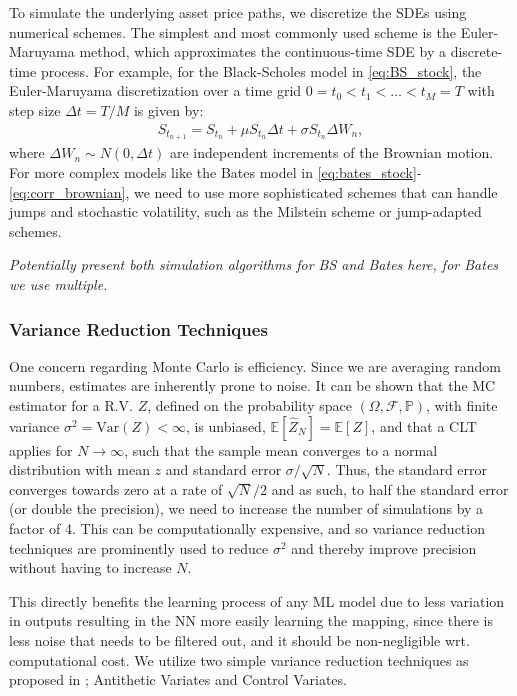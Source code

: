 To simulate the underlying asset price paths, we discretize the SDEs using numerical schemes. The simplest and most commonly used scheme is the Euler-Maruyama method, which approximates the continuous-time SDE by a discrete-time process. For example, for the Black-Scholes model in \eqref{eq:BS_stock}, the Euler-Maruyama discretization over a time grid $0 = t_0 < t_1 < \ldots < t_M = T$ with step size $\Delta t = T/M$ is given by:
\begin{align}
    S_{t_{n+1}} = S_{t_n} + \mu S_{t_n} \Delta t + \sigma S_{t_n} \Delta W_n,
\end{align}
where $\Delta W_n \sim N(0, \Delta t)$ are independent increments of the Brownian motion. For more complex models like the Bates model in \eqref{eq:bates_stock}-\eqref{eq:corr_brownian}, we need to use more sophisticated schemes that can handle jumps and stochastic volatility, such as the Milstein scheme or jump-adapted schemes.

\textit{Potentially present both simulation algorithms for BS and Bates here, for Bates we use multiple.}

\subsubsection{Variance Reduction Techniques}

One concern regarding Monte Carlo is efficiency. Since we are averaging random numbers, estimates are inherently prone to noise. It can be shown that the MC estimator for a R.V. $Z$, defined on the probability space $(\Omega, \mathcal{F}, \mathbb{P})$, with finite variance $\sigma^2 = \text{Var}(Z) < \infty$, is unbiased, $\mathbb{E}[\hat{Z}_N] = \mathbb{E}[Z]$, and that a CLT applies for $N \to \infty$, such that the sample mean converges to a normal distribution with mean $z$ and standard error $\sigma/\sqrt{N}$. Thus, the standard error converges towards zero at a rate of $\sqrt{N}/2$ and as such, to half the standard error (or double the precision), we need to increase the number of simulations by a factor of 4. This can be computationally expensive, and so variance reduction techniques are prominently used to reduce $\sigma^2$ and thereby improve precision without having to increase $N$. 

This directly benefits the learning process of any ML model  due to less variation in outputs resulting in the NN more easily learning the mapping, since there is less noise that needs to be filtered out, and it should be non-negligible wrt. computational cost. We utilize two simple variance reduction techniques as proposed in \textcite{glassermanMonteCarloMethods2003}; Antithetic Variates and Control Variates.

